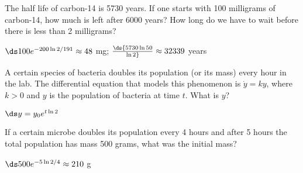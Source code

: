 \begin{exercises}
\exercise The half life of carbon-14 is 5730 years. If one starts
with 100 milligrams of carbon-14, how much is left after 6000
years? How long do we have to wait before there is less than 2
milligrams?
\begin{answer} $\ds 100e^{-200\ln 2/191}\approx 48$ mg; $\ds {5730\ln
  50\over\ln2}\approx 32339$ years
\end{answer}

\exercise A certain species of bacteria doubles its population
(or its mass)
every hour in the lab. 
The differential equation that models this phenomenon
is $\dot{y} =ky$, where $k>0 $ and $y$
is the population of bacteria at time $t$. What is $y$?
\begin{answer} $\ds y=y_0e^{t\ln 2}$
\end{answer}

\exercise If a certain microbe doubles its population every 4
hours and after 5 hours the total population has mass 500 grams,
what was the initial mass?
\begin{answer} $\ds 500e^{-5\ln2/4}\approx 210$ g
\end{answer}

\end{exercises}
